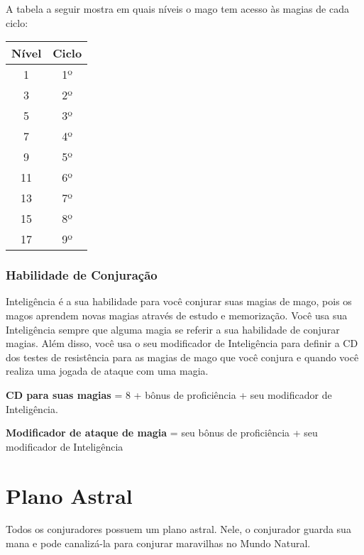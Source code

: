 \documentclass{RPG_Adventure}[2021/10/20]
\begin{document}
\begin{multicols}{2}
A tabela a seguir mostra em quais níveis o mago tem acesso às magias de cada
ciclo:

\begin{center}
\begin{tabular}{|||c||c|||}
    \hline
    \textbf{Nível} & \textbf{Ciclo} \\
    \hline
    1 & 1º \\
    \hline
    3 & 2º \\
    \hline
    5 & 3º \\
    \hline
    7 & 4º \\
    \hline
    9 & 5º \\
    \hline
    11 & 6º \\
    \hline
    13 & 7º \\
    \hline
    15 & 8º \\
    \hline
    17 & 9º \\
    \hline
\end{tabular}
\end{center}

\subsubsection*{Habilidade de Conjuração}%

Inteligência é a sua habilidade para você conjurar suas magias de mago, pois os
magos aprendem novas magias através de estudo e memorização. Você usa sua
Inteligência sempre que alguma magia se referir a sua habilidade de conjurar
magias. Além disso, você usa o seu modificador de Inteligência para definir a CD
dos testes de resistência para as magias de mago que você conjura e quando você
realiza uma jogada de ataque com uma magia.

\begin{center}
\textbf{CD para suas magias} = 8 + bônus de proficiência + seu modificador de
Inteligência. \nl

\textbf{Modificador de ataque de magia} = seu bônus de proficiência + seu
modificador de Inteligência
\end{center}

\section*{Plano Astral}%

Todos os conjuradores possuem um plano astral. Nele, o conjurador guarda sua
mana e pode canalizá-la para conjurar maravilhas no Mundo Natural.


\end{multicols}
\end{document}
